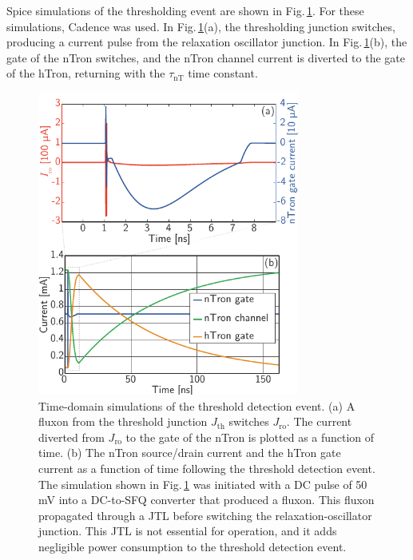 \documentclass[aip,amsmath,amssymb,reprint,nofootinbib]{revtex4-1}
\begin{document}
Spice simulations of the thresholding event are shown in Fig.\,\ref{fig:transmitters_jjTriggersNTron}. For these simulations, Cadence was used. In Fig.\,\ref{fig:transmitters_jjTriggersNTron}(a), the thresholding junction switches, producing a current pulse from the relaxation oscillator junction. In Fig.\,\ref{fig:transmitters_jjTriggersNTron}(b), the gate of the nTron switches, and the nTron channel current is diverted to the gate of the hTron, returning with the $\tau_{\mathrm{nT}}$ time constant. 
\begin{figure}[t!]
	\centerline{\includegraphics[width=8.6cm]{_transmitters_jjTriggersNTron_small.pdf}}
	\caption{\label{fig:transmitters_jjTriggersNTron}Time-domain simulations of the threshold detection event. (a) A fluxon from the threshold junction $J_{\mathrm{th}}$ switches $J_{\mathrm{ro}}$. The current diverted from $J_{\mathrm{ro}}$ to the gate of the nTron is plotted as a function of time. (b) The nTron source/drain current and the hTron gate current as a function of time following the threshold detection event. The simulation shown in Fig.\,\ref{fig:transmitters_jjTriggersNTron} was initiated with a DC pulse of 50\,mV into a DC-to-SFQ converter \cite{vatu1998,ka1999} that produced a fluxon. This fluxon propagated through a JTL before switching the relaxation-oscillator junction. This JTL is not essential for operation, and it adds negligible power consumption to the threshold detection event.}
\end{figure} 
\end{document}
